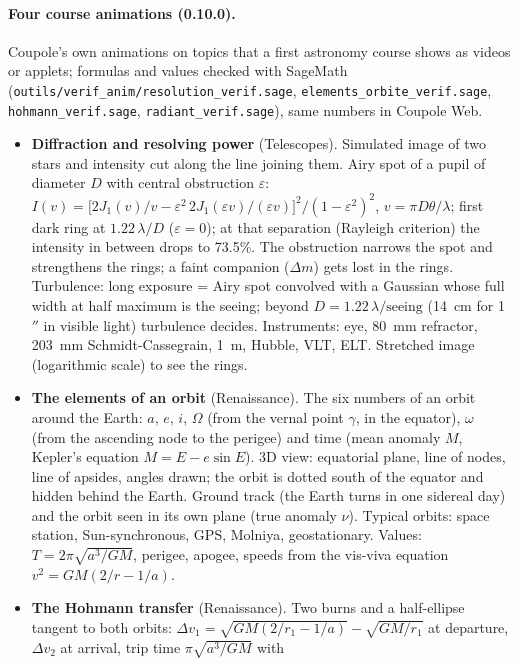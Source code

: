 \paragraph{Four course animations (0.10.0).} Coupole's own animations on topics that a first astronomy course shows as
videos or applets; formulas and values checked with SageMath (\texttt{outils/verif\_anim/resolution\_verif.sage},
\texttt{elements\_orbite\_verif.sage}, \texttt{hohmann\_verif.sage}, \texttt{radiant\_verif.sage}), same numbers in
Coupole Web.
\begin{itemize}
\item \textbf{Diffraction and resolving power} (Telescopes). Simulated image of two stars and intensity cut along the
line joining them. Airy spot of a pupil of diameter $D$ with central obstruction $\varepsilon$:
$I(v)=\big[2J_1(v)/v-\varepsilon^2\,2J_1(\varepsilon v)/(\varepsilon v)\big]^2/(1-\varepsilon^2)^2$, $v=\pi D\theta/\lambda$;
first dark ring at $1.22\,\lambda/D$ ($\varepsilon=0$); at that separation (Rayleigh criterion) the intensity in between
drops to 73.5\%. The obstruction narrows the spot and strengthens the rings; a faint companion ($\Delta m$) gets lost
in the rings. Turbulence: long exposure = Airy spot convolved with a Gaussian whose full width at half maximum is the
seeing; beyond $D=1.22\,\lambda/\text{seeing}$ (14~cm for 1\,$''$ in visible light) turbulence decides. Instruments:
eye, 80~mm refractor, 203~mm Schmidt-Cassegrain, 1~m, Hubble, VLT, ELT. Stretched image (logarithmic scale) to see
the rings.
\item \textbf{The elements of an orbit} (Renaissance). The six numbers of an orbit around the Earth: $a$, $e$, $i$,
$\Omega$ (from the vernal point $\gamma$, in the equator), $\omega$ (from the ascending node to the perigee) and time
(mean anomaly $M$, Kepler's equation $M=E-e\sin E$). 3D view: equatorial plane, line of nodes, line of apsides, angles
drawn; the orbit is dotted south of the equator and hidden behind the Earth. Ground track (the Earth turns in one
sidereal day) and the orbit seen in its own plane (true anomaly $\nu$). Typical orbits: space station, Sun-synchronous,
GPS, Molniya, geostationary. Values: $T=2\pi\sqrt{a^3/GM}$, perigee, apogee, speeds from the vis-viva equation
$v^2=GM(2/r-1/a)$.
\item \textbf{The Hohmann transfer} (Renaissance). Two burns and a half-ellipse tangent to both orbits:
$\Delta v_1=\sqrt{GM(2/r_1-1/a)}-\sqrt{GM/r_1}$ at departure, $\Delta v_2$ at arrival, trip time $\pi\sqrt{a^3/GM}$ with

\end{itemize}
